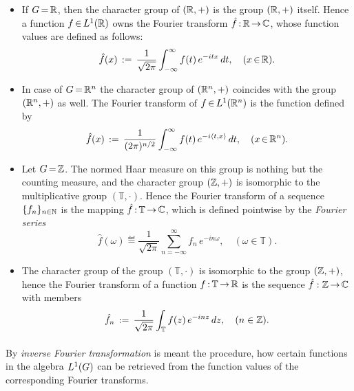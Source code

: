 \documentclass[11pt,twoside]{article}
\begin{document}
\begin{itemize}[leftmargin=12pt]
\item[1.]
If $G {\,=\,} {\mathbb{R}}$,
then the character group of $({\mathbb{R}},+)$ is the group $({\mathbb{R}},+)$ itself.
Hence a function $f {\,\in\,} L^1({\mathbb{R}})$ owns the Fourier transform
$\hat{f} {\,:\,}{\mathbb{R}} {\,\to\,} {\mathbb{C}}$,
whose function values are defined as follows:
\[
\hat{f}(x) \,:=\,
\frac{1}{\sqrt{2\pi}} \int_{- \infty}^{\infty} f(t) \, e^{-itx} \, dt,
\quad (x {\,\in\,} {\mathbb{R}}).
\]

\item[2.]
In case of $G {\,=\,} {\mathbb{R}}^n$
the character group of $({\mathbb{R}}^n,+)$ coincides with the group $({\mathbb{R}}^n,+)$ as well.
The Fourier transform of $f {\,\in\,} L^1({\mathbb{R}}^n)$ is the function defined by
\[
\hat{f}(x) \,:=\,
\frac{1}{(2\pi)^{n/2}}
\int_{- \infty}^{\infty} f(t) \, e^{-i \langle t,x \rangle} \, dt,
\quad (x {\,\in\,} {\mathbb{R}}^n).
\]

\item[3.]
Let $G {\,=\,} {\mathbb{Z}}$.
The normed Haar measure on this group is nothing but the counting measure,
and the character group $({\mathbb{Z}},+)$ is isomorphic to the multiplicative group
$(\mathbb{T},\cdot)$.
Hence the Fourier transform of a sequence $\{f_n\}_{n \in {\mathbb{N}}}$
is the mapping $\hat{f} {\,:\,} \mathbb{T} {\,\to\,} {\mathbb{C}}$,
which is defined pointwise by the \textit{Fourier series}
\[
\hat{f}(\omega) \eqdef
 \frac{1}{\sqrt{2\pi}} \sum_{n= - \infty}^{\infty} f_n \, e^{-i n \omega},
 \quad (\omega \in \mathbb{T}).
\]

\item[4.]
The character group of the group $(\mathbb{T},\cdot)$ is isomorphic
to the group $({\mathbb{Z}},+)$,
hence the Fourier transform of a function
$f {\,:\,} \mathbb{T} {\,\to\,} {\mathbb{R}}$ is the sequence $\hat{f}:{\mathbb{Z}} {\,\to\,} {\mathbb{C}}$ with members
\[
\hat{f}_n \,:=\,
\frac{1}{\sqrt{2\pi}} \int_{\mathbb{T}} f(z) \, e^{-inz} \, dz,
\quad (n \in {\mathbb{Z}}).
\]
\end{itemize}

\paragraph{} %
By \textit{inverse Fourier transformation} is meant the procedure,
how certain functions in the algebra $L^1(G)$ can be retrieved
from the function values of the corresponding Fourier transforms.
\end{document}
